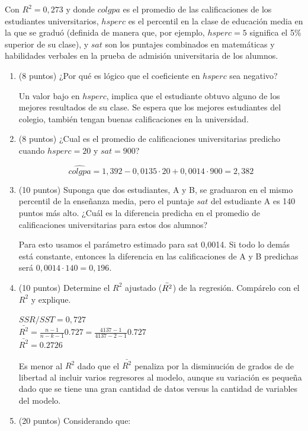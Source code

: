\documentclass[10pt,a4paper]{article}
\begin{document}
\begin{enumerate}
Con $R^2=0,273$ y donde $colgpa$ es el promedio de las calificaciones de los estudiantes universitarios,
$hsperc$ es el percentil en la clase de educación media en la que se graduó (definida de manera que, por
ejemplo, $hsperc= 5$ significa el 5\% superior de su clase), y $sat$ son los puntajes combinados en
matemáticas y habilidades verbales en la prueba de admisión universitaria de los alumnos.
\begin{enumerate} 
\item (8 puntos) ¿Por qué es lógico que el coeficiente en $hsperc$ sea negativo?

{\color{blue} Un valor  bajo en $hsperc$, implica que el estudiante obtuvo alguno de los mejores resultados de su clase. Se espera que los mejores estudiantes del colegio, también tengan buenas calificaciones en la universidad.  }
\item  (8 puntos) ¿Cual es el promedio de calificaciones universitarias predicho cuando $hsperc= 20$ y $sat=900$?

{\color{blue} $$\hat{colgpa} =1,392 -0,0135 \cdot 20 + 0,0014 \cdot 900=2,382$$}


\item (10 puntos) Suponga que dos estudiantes, A y B, se graduaron en el mismo percentil de la enseñanza media, pero el puntaje $sat$ del estudiante A es 140 puntos más alto. ¿Cuál es la diferencia predicha en el promedio
de calificaciones universitarias para estos dos alumnos? 

{\color{blue} Para esto usamos el parámetro estimado para sat 0,0014. Si todo lo demás está constante, entonces la diferencia en las calificaciones de A y B predichas será $0,0014\cdot 140=0,196$.}

\item (10 puntos) Determine el $R^2$ ajustado ($\Bar{R^2}$) de la regresión. Compárelo con el $R^2$ y explique.

{\color{blue}
$SSR/SST=	0,727$\\
$\bar{R^2}=\frac{n-1}{n-k-1}0.727=\frac{4137-1}{4137-2-1}0.727$\\
$\bar{R^2}=0.2726$

Es menor al $R^2$ dado que el $\bar{R^2}$ penaliza por la disminución de grados de de libertad al incluir varios regresores al modelo, aunque su variación es pequeña dado que se tiene una gran cantidad de datos versus la cantidad de variables del modelo.}

\item (20 puntos) Considerando que:


\end{enumerate}
\end{enumerate}
\end{document}
